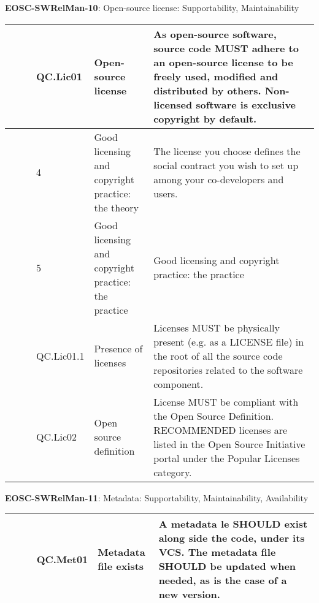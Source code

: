 \textbf{EOSC-SWRelMan-10}: Open-source license: Supportability, Maintainability
\nopagebreak[4]
\begin{center}
    \tabletail{\hline}
    \tiny
    \begin{supertabular}{|p{0.10\linewidth}|p{0.10\linewidth}|p{0.20\linewidth}|p{0.60\linewidth}|} \hline
        \cite{orviz_set_2017} & QC.Lic01 & Open-source license & As open-source software, source code MUST adhere to an open-source license to be freely used, modified and distributed by others. Non-licensed software is exclusive copyright by default.\\ \hline
        \cite{raymond_software_2013} & 4 & Good licensing and copyright practice: the theory & The license you choose defines the social contract you wish to set up among your co-developers and users.\\ \hline
        \cite{raymond_software_2013} & 5 & Good licensing and copyright practice: the practice & Good licensing and copyright practice: the practice\\ \hline
        \cite{orviz_set_2017} & QC.Lic01.1 & Presence of licenses & Licenses MUST be physically present (e.g. as a LICENSE file) in the root of all the source code repositories related to the software component.\\ \hline
        \cite{orviz_set_2017} & QC.Lic02 & Open source definition & License MUST be compliant with the Open Source Definition. RECOMMENDED licenses are listed in the Open Source Initiative portal under the Popular Licenses category.\\ \hline
    \end{supertabular}
\end{center}

\textbf{EOSC-SWRelMan-11}: Metadata: Supportability, Maintainability, Availability
\nopagebreak[4]
\begin{center}
    \tabletail{\hline}
    \tiny
    \begin{supertabular}{|p{0.10\linewidth}|p{0.10\linewidth}|p{0.20\linewidth}|p{0.60\linewidth}|} \hline
        \cite{orviz_set_2017} & QC.Met01 & Metadata file exists & A metadata le SHOULD exist along side the code, under its VCS. The metadata file SHOULD be updated when needed, as is the case of a new version.\\ \hline
    \end{supertabular}
\end{center}

